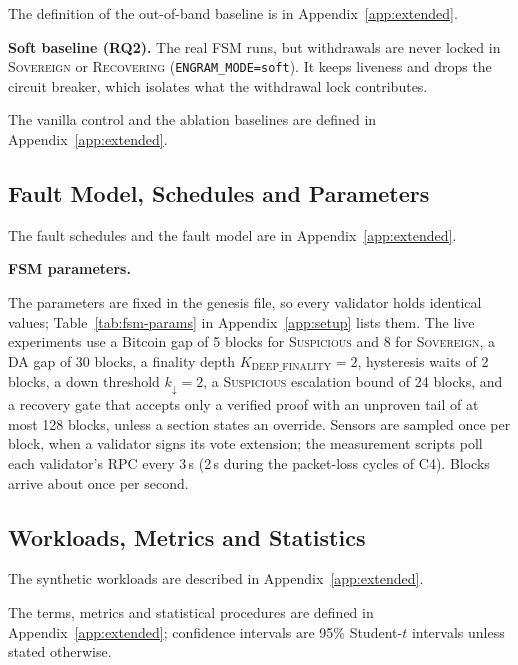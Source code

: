 The definition of the out-of-band baseline is in Appendix~\ref{app:extended}.

\textbf{Soft baseline (RQ2).} The real FSM runs, but withdrawals are never
locked in \textsc{Sovereign} or \textsc{Recovering}
(\texttt{ENGRAM\_MODE=soft}). It keeps liveness and drops the circuit
breaker, which isolates what the withdrawal lock contributes.

The vanilla control and the ablation baselines are defined in Appendix~\ref{app:extended}.

\subsection{Fault Model, Schedules and Parameters}
The fault schedules and the fault model are in Appendix~\ref{app:extended}.

\textbf{FSM parameters.}\label{subsec:params}

The parameters are fixed in the genesis file, so every validator holds identical
values; Table~\ref{tab:fsm-params} in Appendix~\ref{app:setup} lists them. The live
experiments use a Bitcoin gap of 5 blocks for \textsc{Suspicious} and 8 for
\textsc{Sovereign}, a DA gap of 30 blocks, a finality depth
$K_{\text{DEEP\_FINALITY}}{=}2$, hysteresis waits of 2 blocks, a down threshold
$k_{\downarrow}{=}2$, a \textsc{Suspicious} escalation bound of 24 blocks, and a
recovery gate that accepts only a verified proof with an unproven tail of at most
128 blocks, unless a section states an override. Sensors are sampled once per
block, when a validator signs its vote extension; the measurement scripts poll
each validator's RPC every 3\,s (2\,s during the packet-loss cycles of C4). Blocks
arrive about once per second.


\subsection{Workloads, Metrics and Statistics}
\label{subsec:metrics}

The synthetic workloads are described in Appendix~\ref{app:extended}.

The terms, metrics and statistical procedures are defined in Appendix~\ref{app:extended}; confidence intervals are 95\% Student-$t$ intervals unless stated otherwise.
